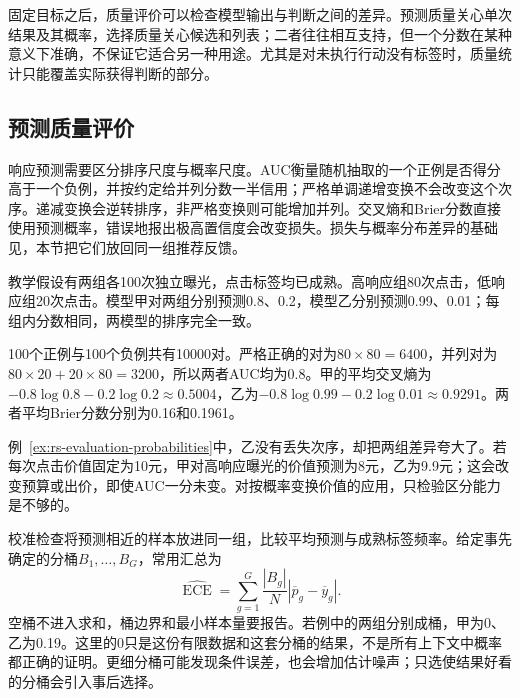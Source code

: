 固定目标之后，质量评价可以检查模型输出与判断之间的差异。预测质量关心单次结果及其概率，选择质量关心候选和列表；二者往往相互支持，但一个分数在某种意义下准确，不保证它适合另一种用途。尤其是对未执行行动没有标签时，质量统计只能覆盖实际获得判断的部分。

\subsection{预测质量评价}
\label{sec:rs-evaluation-prediction}

响应预测需要区分排序尺度与概率尺度。AUC衡量随机抽取的一个正例是否得分高于一个负例，并按约定给并列分数一半信用；严格单调递增变换不会改变这个次序。递减变换会逆转排序，非严格变换则可能增加并列。交叉熵和Brier分数直接使用预测概率，错误地报出极高置信度会改变损失。损失与概率分布差异的基础见，本节把它们放回同一组推荐反馈。

\begin{example}[次序相同而概率尺度不同]
\label{ex:rs-evaluation-probabilities}
教学假设有两组各100次独立曝光，点击标签均已成熟。高响应组80次点击，低响应组20次点击。模型甲对两组分别预测0.8、0.2，模型乙分别预测0.99、0.01；每组内分数相同，两模型的排序完全一致。

100个正例与100个负例共有10000对。严格正确的对为$80\times80=6400$，并列对为$80\times20+20\times80=3200$，所以两者AUC均为0.8。甲的平均交叉熵为$-0.8\log0.8-0.2\log0.2\approx0.5004$，乙为$-0.8\log0.99-0.2\log0.01\approx0.9291$。两者平均Brier分数分别为0.16和0.1961。
\end{example}

例~\ref{ex:rs-evaluation-probabilities}中，乙没有丢失次序，却把两组差异夸大了。若每次点击价值固定为10元，甲对高响应曝光的价值预测为8元，乙为9.9元；这会改变预算或出价，即使AUC一分未变。对按概率变换价值的应用，只检验区分能力是不够的。

校准检查将预测相近的样本放进同一组，比较平均预测与成熟标签频率。给定事先确定的分桶$B_1,\ldots,B_G$，常用汇总为
\begin{equation}
  \widehat{\operatorname{ECE}}
    =\sum_{g=1}^{G}\frac{|B_g|}{N}
       \left|\overline p_g-\overline y_g\right|.
  \label{eq:rs-evaluation-ece}
\end{equation}
空桶不进入求和，桶边界和最小样本量要报告。若例中的两组分别成桶，甲为0、乙为0.19。这里的0只是这份有限数据和这套分桶的结果，不是所有上下文中概率都正确的证明。更细分桶可能发现条件误差，也会增加估计噪声；只选使结果好看的分桶会引入事后选择。

